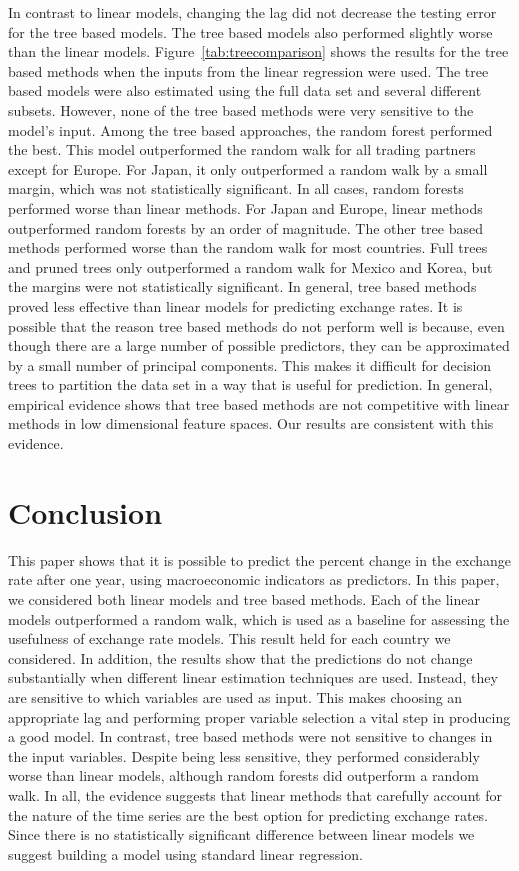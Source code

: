 \documentclass{sig-alternate-05-2015}
\begin{document}
\par{} In contrast to linear models, changing the lag did not decrease the testing error for the tree based models. The tree based models also performed slightly worse than the linear models. Figure~\ref{tab:treecomparison} shows the results for the tree based methods when the inputs from the linear regression were used. The tree based models were also estimated using the full data set and several different subsets. However, none of the tree based methods were very sensitive to the model's input. Among the tree based approaches, the random forest performed the best. This model outperformed the random walk for all trading partners except for Europe. For Japan, it only outperformed a random walk by a small margin, which was not statistically significant. In all cases, random forests performed worse than linear methods. For Japan and Europe, linear methods outperformed random forests by an order of magnitude. The other tree based methods performed worse than the random walk for most countries. Full trees and pruned trees only outperformed a random walk for Mexico and Korea, but the margins were not statistically significant. In general, tree based methods proved less effective than linear models for predicting exchange rates. It is possible that the reason tree based methods do not perform well is because, even though there are a large number of possible predictors, they can be approximated by a small number of principal components. This makes it difficult for decision trees to partition the data set in a way that is useful for prediction. In general, empirical evidence shows that tree based methods are not competitive with linear methods in low dimensional feature spaces. Our results are consistent with this evidence.


\section{Conclusion}

This paper shows that it is possible to predict the percent change in the exchange rate after one year, using macroeconomic indicators as predictors. In this paper, we considered both linear models and tree based methods. Each of the linear models outperformed a random walk, which is used as a baseline for assessing the usefulness of exchange rate models. This result held for each country we considered. In addition, the results show that the predictions do not change substantially when different linear estimation techniques are used. Instead, they are sensitive to which variables are used as input. This makes choosing an appropriate lag and performing proper variable selection a vital step in producing a good model. In contrast, tree based methods were not sensitive to changes in the input variables. Despite being less sensitive, they performed considerably worse than linear models, although random forests did outperform a random walk. In all, the evidence suggests that linear methods that carefully account for the nature of the time series are the best option for predicting exchange rates. Since there is no statistically significant difference between linear models we suggest building a model using standard linear regression.
\end{document}
